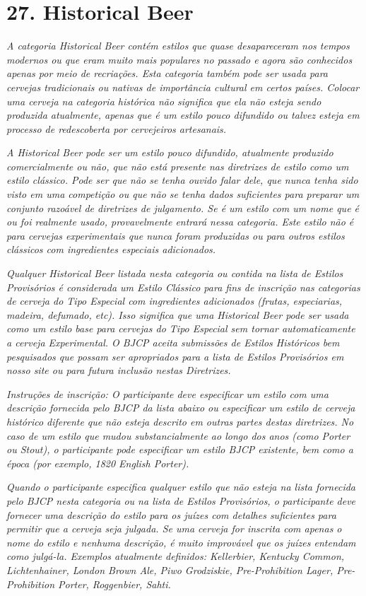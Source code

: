 \section*{27. Historical Beer}
\textit{A categoria Historical Beer contém estilos que quase desapareceram nos tempos modernos ou que eram muito mais populares no passado e agora são conhecidos apenas por meio de recriações. Esta categoria também pode ser usada para cervejas tradicionais ou nativas de importância cultural em certos países. Colocar uma cerveja na categoria histórica não significa que ela não esteja sendo produzida atualmente, apenas que é um estilo pouco difundido ou talvez esteja em processo de redescoberta por cervejeiros artesanais.}

\textit{A Historical Beer pode ser um estilo pouco difundido, atualmente produzido comercialmente ou não, que não está presente nas diretrizes de estilo como um estilo clássico. Pode ser que não se tenha ouvido falar dele, que nunca tenha sido visto em uma competição ou que não se tenha dados suficientes para preparar um conjunto razoável de diretrizes de julgamento. Se é um estilo com um nome que é ou foi realmente usado, provavelmente entrará nessa categoria. Este estilo não é para cervejas experimentais que nunca foram produzidas ou para outros estilos clássicos com ingredientes especiais adicionados.}

\textit{Qualquer Historical Beer listada nesta categoria ou contida na lista de Estilos Provisórios é considerada um Estilo Clássico para fins de inscrição nas categorias de cerveja do Tipo Especial com ingredientes adicionados (frutas, especiarias, madeira, defumado, etc). Isso significa que uma Historical Beer pode ser usada como um estilo base para cervejas do Tipo Especial sem tornar automaticamente a cerveja Experimental. O BJCP aceita submissões de Estilos Históricos bem pesquisados que possam ser apropriados para a lista de Estilos Provisórios em nosso site ou para futura inclusão nestas Diretrizes.}

\textit{Instruções de inscrição: O participante deve especificar um estilo com uma descrição fornecida pelo BJCP da lista abaixo ou especificar um estilo de cerveja histórico diferente que não esteja descrito em outras partes destas diretrizes. No caso de um estilo que mudou substancialmente ao longo dos anos (como Porter ou Stout), o participante pode especificar um estilo BJCP existente, bem como a época (por exemplo, 1820 English Porter).}

\textit{Quando o participante especifica qualquer estilo que não esteja na lista fornecida pelo BJCP nesta categoria ou na lista de Estilos Provisórios, o participante deve fornecer uma descrição do estilo para os juízes com detalhes suficientes para permitir que a cerveja seja julgada. Se uma cerveja for inscrita com apenas o nome do estilo e nenhuma descrição, é muito improvável que os juízes entendam como julgá-la. Exemplos atualmente definidos: Kellerbier, Kentucky Common, Lichtenhainer, London Brown Ale, Piwo Grodziskie, Pre-Prohibition Lager, Pre-Prohibition Porter, Roggenbier, Sahti.}
